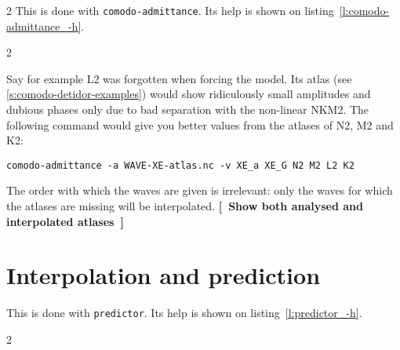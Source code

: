 \documentclass[11pt]{article} %
\providecommand{\code}[1]{\hbox{\lstinline|#1|}}
\providecommand{\cmdhelp}[1]{\end{multicols}\begin{multicols}{2}}
\newcommand{\lref}[1]{listing~\ref{#1}}
\providecommand{\mynote}[1]{{\color[rgb]{1,.4,0}\sffamily\bfseries[~#1~]}}%
\providecommand{\mynote}[1]{}%
\begin{document}
\begin{multicols}{2}
This is done with \code{comodo-admittance}.
Its help is shown on \lref{l:comodo-admittance_-h}.
\cmdhelp{comodo-admittance}

Say for example L2 was forgotten when forcing the model.
Its atlas (see \ref{s:comodo-detidor-examples}) would show ridiculously small amplitudes and dubious phases only due to bad separation with the non-linear NKM2.
The following command would give you better values from the atlases of N2, M2 and K2:
\begin{lstlisting}
comodo-admittance -a WAVE-XE-atlas.nc -v XE_a XE_G N2 M2 L2 K2
\end{lstlisting}
The order with which the waves are given is irrelevant:
  only the waves for which the atlases are missing will be interpolated.
\mynote{Show both analysed and interpolated atlases}

\section{Interpolation and prediction}

This is done with \code{predictor}.
Its help is shown on \lref{l:predictor_-h}.
\cmdhelp{predictor}


\end{multicols}
\end{document}
